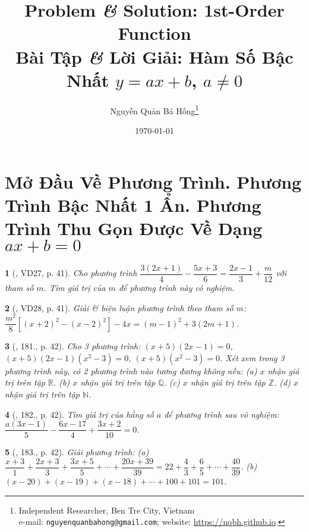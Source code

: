 \documentclass{article}
\title{Problem {\it\&} Solution: 1st-Order Function\\Bài Tập {\it\&} Lời Giải: Hàm Số Bậc Nhất $y = ax + b$, $a\ne0$}
\author{Nguyễn Quản Bá Hồng\footnote{Independent Researcher, Ben Tre City, Vietnam\\e-mail: \texttt{nguyenquanbahong@gmail.com}; website: \url{https://nqbh.github.io}.}}
\date{\today}
\newtheorem{baitoan}{}
\begin{document}
\maketitle
\tableofcontents


\section{Mở Đầu Về Phương Trình. Phương Trình Bậc Nhất 1 Ẩn. Phương Trình Thu Gọn Được Về Dạng $ax + b = 0$}

\begin{baitoan}[\cite{Tuyen_Toan_8}, VD27, p. 41]
	Cho phương trình $\dfrac{3(2x + 1)}{4} - \dfrac{5x + 3}{6} = \dfrac{2x - 1}{3} + \dfrac{m}{12}$ với tham số $m$. Tìm giá trị của $m$ để phương trình này có nghiệm.
\end{baitoan}

\begin{baitoan}[\cite{Tuyen_Toan_8}, VD28, p. 41]
	Giải \& biện luận phương trình theo tham số $m$: $\dfrac{m^2}{8}\left[(x + 2)^2 - (x  - 2)^2\right] - 4x = (m - 1)^2 + 3(2m + 1)$.
\end{baitoan}

\begin{baitoan}[\cite{Tuyen_Toan_8}, 181., p. 42]
	Cho 3 phương trình: $(x + 5)(2x - 1) = 0$, $(x + 5)(2x - 1)(x^2 - 3) = 0$, $(x + 5)(x^2 - 3) = 0$. Xét xem trong 3 phương trình này, có 2 phương trình nào tương đương không nếu: (a) $x$ nhận giá trị trên tập $\mathbb{R}$. (b) $x$ nhận giá trị trên tập $\mathbb{Q}$. (c) $x$ nhận giá trị trên tập $\mathbb{Z}$. (d) $x$ nhận giá trị trên tập $\mathbb{N}$.
\end{baitoan}

\begin{baitoan}[\cite{Tuyen_Toan_8}, 182., p. 42]
	Tìm giá trị của hằng số $a$ để phương trình sau vô nghiệm: $\dfrac{a(3x - 1)}{5} - \dfrac{6x - 17}{4} + \dfrac{3x + 2}{10} = 0$.
\end{baitoan}

\begin{baitoan}[\cite{Tuyen_Toan_8}, 183., p. 42]
	Giải phương trình: (a) $\dfrac{x + 3}{1} + \dfrac{2x + 3}{3} + \dfrac{3x + 5}{5} + \cdots + \dfrac{20x + 39}{39} = 22 + \dfrac{4}{3} + \dfrac{6}{5} + \cdots + \dfrac{40}{39}$. (b) $(x - 20) + (x - 19) + (x - 18) + \cdots + 100 + 101 = 101$.
\end{baitoan}
\end{document}
